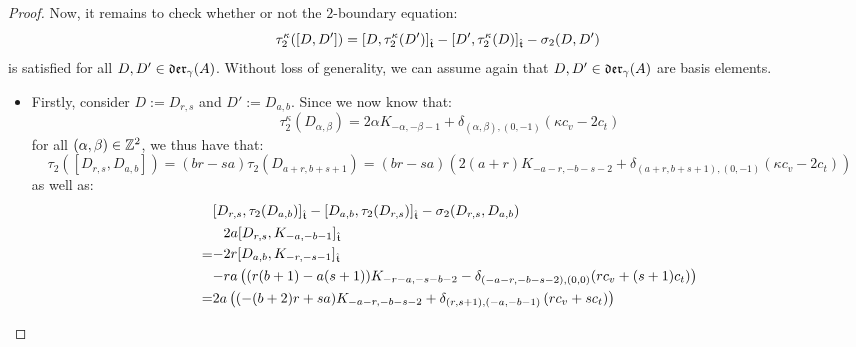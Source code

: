\begin{proof}
                Now, it remains to check whether or not the $2$-boundary equation:
                    $$\tau_2^{\kappa}([D, D']) = [D, \tau_2^{\kappa}(D')]_{\extendedtoroidal} - [D', \tau_2^{\kappa}(D)]_{\extendedtoroidal} - \sigma_2(D, D')$$
                is satisfied for all $D, D' \in \divzero$. Without loss of generality, we can assume again that $D, D' \in \divzero$ are basis elements.
                \begin{itemize}
                    \item Firstly, consider $D := D_{r, s}$ and $D' := D_{a, b}$. Since we now know that:
                        $$\tau_2^{\kappa}(D_{\alpha, \beta}) = 2\alpha K_{-\alpha, -\beta - 1} + \delta_{(\alpha, \beta), (0, -1)} ( \kappa c_v - 2c_t )$$
                    for all $(\alpha, \beta) \in \Z^2$, we thus have that:
                        $$\tau_2([ D_{r, s}, D_{a, b} ]) = (br - sa) \tau_2(D_{a + r, b + s + 1}) = (br - sa) \left( 2(a + r) K_{-a - r, -b - s - 2} + \delta_{(a + r, b + s + 1), (0, -1)} ( \kappa c_v - 2c_t ) \right)$$
                    as well as:
                        $$
                            \begin{aligned}
                                & [D_{r, s}, \tau_2(D_{a, b})]_{\extendedtoroidal} - [D_{a, b}, \tau_2(D_{r, s})]_{\extendedtoroidal} - \sigma_2(D_{r, s}, D_{a, b})
                                \\
                                = &
                                \begin{aligned}
                                    & 2a [ D_{r, s}, K_{-a, -b - 1} ]_{\extendedtoroidal}
                                    \\
                                    - & 2r [ D_{a, b}, K_{-r, -s - 1} ]_{\extendedtoroidal}
                                    \\
                                    - & ra \left( ( r(b + 1) - a(s + 1) )K_{-r - a, -s - b - 2} -\delta_{ (-a - r, -b - s - 2), (0, 0) } (r c_v + (s + 1) c_t) \right)
                                \end{aligned}
                                \\
                                = &
                                \begin{aligned}
                                    & 2a \left( (-(b + 2)r + sa) K_{-a - r, -b - s - 2} + \delta_{(r, s + 1), (-a, -b - 1)} \left( r c_v + s c_t \right) \right)
                                    \\

\end{aligned}
\end{aligned}$$
\end{itemize}
\end{proof}

